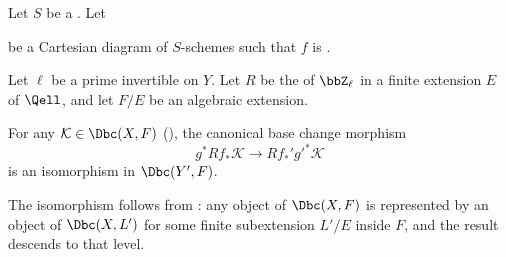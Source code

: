 \begin{theorem} \label{theorem:proper_base_change_theorem_for_derived_category_of_adic_sheaves_with_algebraic_coefficients_on_schemes}
    Let $S$ be a . Let
    \begin{center}
    \end{center}
    be a Cartesian diagram of $S$-schemes such that $f$ is .

    Let $\ell$ be a prime invertible on $Y$. Let $R$ be the  of $\bbZ_\ell$ in a finite extension $E$ of $\Qell$, and let $F/E$ be an algebraic extension.

    For any $\mathcal{K} \in \Dbc(X, F)$ (), the canonical base change morphism
    $$g^* Rf_* \mathcal{K} \to Rf_*' {g'}^* \mathcal{K}$$
    is an isomorphism in $\Dbc(Y', F)$.

    The isomorphism follows from : any object of $\Dbc(X, F)$ is represented by an object of $\Dbc(X, L')$ for some finite subextension $L'/E$ inside $F$, and the result descends to that level.
\end{theorem}
